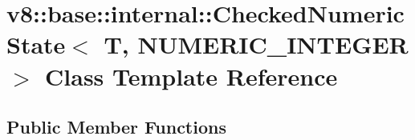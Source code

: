 \hypertarget{classv8_1_1base_1_1internal_1_1CheckedNumericState_3_01T_00_01NUMERIC__INTEGER_01_4}{}\section{v8\+:\+:base\+:\+:internal\+:\+:Checked\+Numeric\+State$<$ T, N\+U\+M\+E\+R\+I\+C\+\_\+\+I\+N\+T\+E\+G\+ER $>$ Class Template Reference}
\label{classv8_1_1base_1_1internal_1_1CheckedNumericState_3_01T_00_01NUMERIC__INTEGER_01_4}
\subsection*{Public Member Functions}
